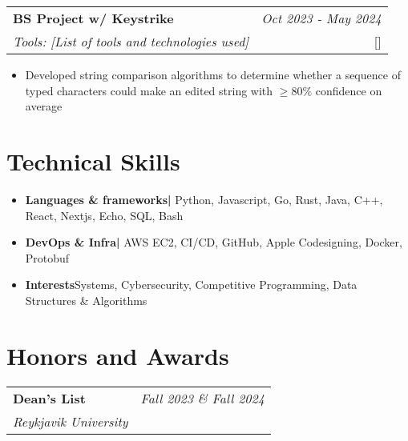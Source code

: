 \documentclass{article}
\makeatletter
\newcommand{\resumeItem}[2]{
  \item{
    \textbf{#1}{\hspace{0.5mm}#2 \vspace{-0.5mm}}
  }
}
\newcommand{\resumeProject}[4]{
\vspace{0.5mm}
    \begin{tabular*}{0.98\textwidth}[t]{l@{\extracolsep{\fill}}r}
        \textbf{#1} & \textit{\footnotesize{#3}} \\
        \footnotesize{\textit{#2}} & \footnotesize{#4}
    \end{tabular*}
    \vspace{-2.4mm}
}
\newcommand{\resumeSubItem}[2]{\resumeItem{#1}{#2}\vspace{-4pt}}
\newcommand{\resumeSubHeadingListStart}{}
\newcommand{\resumeHeadingSkillStart}{\begin{itemize}[leftmargin=*,itemsep=1.7mm, rightmargin=2ex]}
\newcommand{\resumeItemListStart}{\begin{itemize}[leftmargin=*,labelsep=1mm,itemsep=0.5mm]}
\newcommand{\resumeSubHeadingListEnd}{}
\newcommand{\resumeHeadingSkillEnd}{\end{itemize}\vspace{-2mm}}
\newcommand{\resumeItemListEnd}{\end{itemize}\vspace{-2mm}}
\newcommand{\socialicon}[1]{\raisebox{-0.05em}{\resizebox{!}{1em}{#1}}}
\makeatother
\begin{document}
\resumeProject
  {BS Project w/ Keystrike}
  {Tools: [List of tools and technologies used]}
  {Oct 2023 - May 2024}
  {{}[\href{https://skemman.is/bitstream/1946/47651/1/Reykjavik_University_Keystrike_Final_Report.pdf}{\textcolor{black}{\faFile}}]}
\resumeItemListStart

  \item Developed string comparison algorithms to determine whether a sequence of typed characters could make an edited string with $\ge 80\%$ confidence on average
\resumeItemListEnd


\resumeSubHeadingListEnd

\vspace{-3mm}
\section{\textbf{Technical Skills}}
 \resumeHeadingSkillStart
 \resumeSubItem{Languages \& frameworks| }
    {Python, Javascript, Go, Rust, Java, C++, React, Nextjs, Echo, SQL, Bash}

	\resumeSubItem{DevOps \& Infra| }
    {AWS EC2, CI/CD, GitHub, Apple Codesigning, Docker, Protobuf}

	\resumeSubItem{Interests}
	{Systems, Cybersecurity, Competitive Programming, Data Structures \& Algorithms}
 \resumeHeadingSkillEnd

 \vspace{-2mm}
\section{\textbf{Honors and Awards}}
\vspace{-0.4mm}
\resumeSubHeadingListStart

\resumeProject
  {Dean's List}
  {Reykjavik University}
  {Fall 2023 \& Fall 2024}
  {}
\vspace{3mm}
\end{document}
